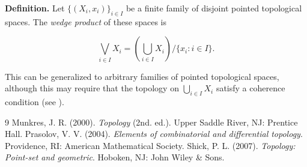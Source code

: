 \documentclass[12pt]{article}
\begin{document}
{\bf Definition.} Let $\{(X_i,x_i)\}_{i\in I}$ be a finite family of disjoint pointed topological spaces. The \emph{wedge product} of these spaces is

$$\bigvee_{i\in I} X_i = \left(\bigcup_{i\in I} X_i\right) / \{x_i: i\in I\}.$$

This can be generalized to arbitrary families of pointed topological spaces, although this may require that the topology on $\bigcup_{i\in I} X_i$ satisfy a coherence condition (see \cite{Munkres}).

\begin{thebibliography} {9}
 Munkres, J. R. (2000). \emph{Topology} (2nd. ed.). Upper Saddle River, NJ: Prentice Hall.
 Prasolov, V. V. (2004). \emph{Elements of combinatorial and differential topology}. Providence, RI: American Mathematical Society.
 Shick, P. L. (2007). \emph{Topology: Point-set and geometric}. Hoboken, NJ: John Wiley \& Sons.
\end{thebibliography}





\end{document}
